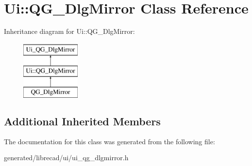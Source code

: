 \hypertarget{classUi_1_1QG__DlgMirror}{\section{Ui\-:\-:Q\-G\-\_\-\-Dlg\-Mirror Class Reference}
\label{classUi_1_1QG__DlgMirror}
}
Inheritance diagram for Ui\-:\-:Q\-G\-\_\-\-Dlg\-Mirror\-:\begin{figure}[H]
\begin{center}
\leavevmode
\includegraphics[height=3.000000cm]{classUi_1_1QG__DlgMirror}
\end{center}
\end{figure}
\subsection*{Additional Inherited Members}


The documentation for this class was generated from the following file\-:\begin{DoxyCompactItemize}
\item 
generated/librecad/ui/ui\-\_\-qg\-\_\-dlgmirror.\-h\end{DoxyCompactItemize}
